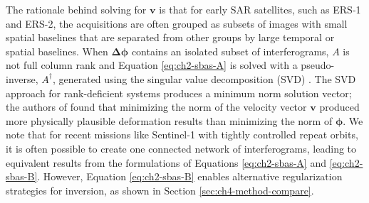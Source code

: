 The rationale behind solving for $\bm{v}$ is that for early SAR satellites, such as ERS-1 and ERS-2, the acquisitions are often grouped as subsets of images with small spatial baselines that are separated from other groups by large temporal or spatial baselines. 
When $\bm{\Delta \phi}$ contains an isolated subset of interferograms, $A$ is not full column rank and Equation \eqref{eq:ch2-sbas-A} is solved with a pseudo-inverse, $A^{\dagger}$, generated using the singular value decomposition (SVD) \citep{Strang2006LinearAlgebraIts}. The SVD approach for rank-deficient systems produces a minimum norm solution vector; the authors of \cite{Berardino2002NewAlgorithmSurface} found that minimizing the norm of the velocity vector $ \bm{v} $ produced more physically plausible deformation results than minimizing the norm of $ \bm{\phi} $. We note that for recent missions like Sentinel-1 with tightly controlled repeat orbits, it is often possible to create one connected network of interferograms, leading to equivalent results from the formulations of Equations \eqref{eq:ch2-sbas-A} and \eqref{eq:ch2-sbas-B}. However, Equation \eqref{eq:ch2-sbas-B} enables alternative regularization strategies for inversion, as shown in Section \ref{sec:ch4-method-compare}.











